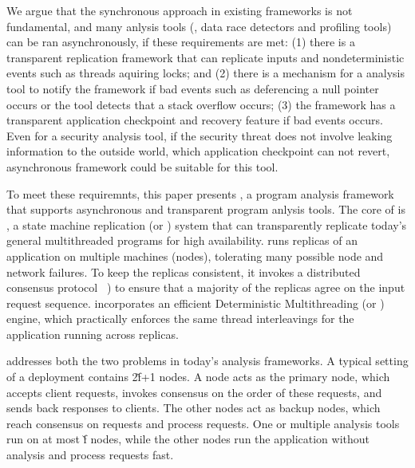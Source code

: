 We argue that the synchronous approach in existing frameworks is not 
fundamental, and many anlysis tools (\eg, data race detectors and profiling 
tools) can be ran asynchronously, if these requirements are met: (1) there is a 
transparent replication framework that can replicate inputs and 
nondeterministic events such as threads aquiring locks; and (2) there is a 
mechanism for a analysis tool to notify the framework if bad events such as 
deferencing a null pointer occurs or the tool detects that a stack overflow 
occurs; (3) the framework has a transparent application checkpoint and recovery 
feature if bad events occurs. Even for a security analysis tool, if the 
security threat does not involve leaking information to the outside world, 
which application checkpoint can not revert, asynchronous framework could be 
suitable for this tool.




To meet these requiremnts, this paper presents \xxx, a program analysis 
framework that supports asynchronous and transparent program anlysis tools. The 
core of \xxx is \repbox, a state machine replication (or \smr) system that can 
transparently replicate today's general multithreaded programs for high 
availability. \smr runs replicas of an application on multiple machines 
(nodes), tolerating many possible node and network failures.  To keep the 
replicas consistent, it invokes a distributed consensus protocol 
\paxos~\cite{paxos}) to ensure that a majority of the replicas agree on the 
input request sequence. \repbox incorporates an efficient Deterministic 
Multithreading (or \dmt) engine, which practically enforces the same thread 
interleavings for the application running across replicas.

\xxx addresses both the two problems in today's analysis frameworks. A typical 
setting of a \xxx deployment contains 2\v{f}+1 nodes. A node acts as the 
primary node, which accepts client requests, invokes \paxos consensus on the 
order of these requests, and sends back responses to clients. The other nodes 
act as backup nodes, which reach consensus on requests and process requests. 
One or multiple analysis tools run on at most \v{f} nodes, while the other 
nodes run the application without analysis and process requests fast.

